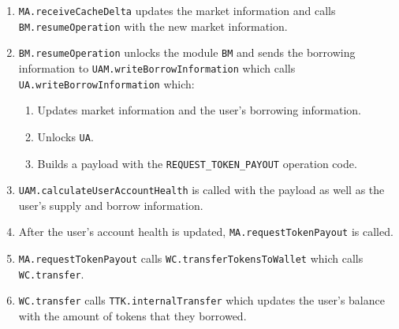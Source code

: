\begin{enumerate}
  \item \verb|MA.receiveCacheDelta| updates the market information and calls \\\verb|BM.resumeOperation| with the new market information.
  \item \verb|BM.resumeOperation| unlocks the module \verb|BM| and sends the borrowing information to \verb|UAM.writeBorrowInformation| which calls \\\verb|UA.writeBorrowInformation| which:
  \begin{enumerate}[label*=\arabic*.]
    \item Updates market information and the user's borrowing information.
    \item Unlocks \verb|UA|.
    \item Builds a payload with the \verb|REQUEST_TOKEN_PAYOUT| operation code.
  \end{enumerate}
  \item \verb|UAM.calculateUserAccountHealth| is called with the payload as well as the user's supply and borrow information.
  \item After the user's account health is updated, \verb|MA.requestTokenPayout| is called.
  \item \verb|MA.requestTokenPayout| calls \verb|WC.transferTokensToWallet| which calls \verb|WC.transfer|.
  \item \verb|WC.transfer| calls \verb|TTK.internalTransfer| which updates the user's balance with the amount of tokens that they borrowed.
\end{enumerate}

